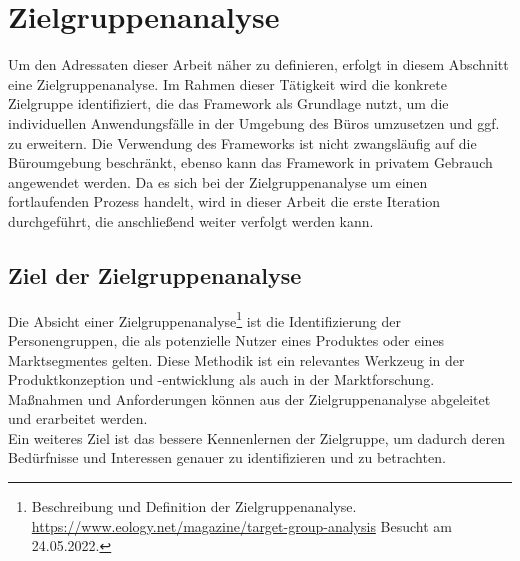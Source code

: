 \section{Zielgruppenanalyse}
\label{sec:zielgruppenanalyse}
    Um den Adressaten dieser Arbeit näher zu definieren, erfolgt in diesem Abschnitt eine Zielgruppenanalyse. %
    Im Rahmen dieser Tätigkeit wird die konkrete Zielgruppe identifiziert, die das Framework als Grundlage nutzt, um die individuellen 
    Anwendungsfälle in der Umgebung des Büros umzusetzen und ggf. zu erweitern. Die Verwendung des Frameworks ist nicht zwangsläufig auf die Büroumgebung beschränkt, ebenso kann 
    das Framework in privatem Gebrauch angewendet werden. Da es sich bei der Zielgruppenanalyse um einen fortlaufenden Prozess handelt, wird in dieser Arbeit die erste Iteration durchgeführt, 
    die anschließend weiter verfolgt werden kann. 
    
    \subsection{Ziel der Zielgruppenanalyse}
        Die Absicht einer Zielgruppenanalyse\footnote{Beschreibung und Definition der Zielgruppenanalyse. \url{https://www.eology.net/magazine/target-group-analysis} Besucht am 24.05.2022.} 
        ist die Identifizierung der Personengruppen, die als potenzielle Nutzer eines Produktes 
        oder eines Marktsegmentes gelten. Diese Methodik ist ein relevantes Werkzeug in der Produktkonzeption und -entwicklung 
        als auch in der Marktforschung. Maßnahmen und Anforderungen können aus der Zielgruppenanalyse abgeleitet und 
        erarbeitet werden. 
        \\
        Ein weiteres Ziel ist das bessere Kennenlernen der Zielgruppe, um dadurch deren Bedürfnisse und Interessen 
        genauer zu identifizieren und zu betrachten. 
    
